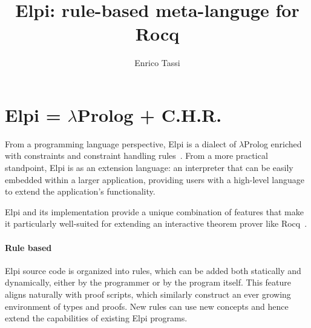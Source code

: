 \documentclass[sigplan,natbib=false]{acmart}
\author{Enrico Tassi}
\affiliation{%
    \institution{Université Côte d'Azur, Inria}
    \country{France}
}
\title{Elpi: rule-based meta-languge for Rocq}
\begin{document}
\maketitle

\section{Elpi = $\lambda$Prolog + C.H.R.}

% 

From a programming language perspective, Elpi is a dialect of $\lambda$Prolog
enriched with constraints and constraint handling rules~\cite{dunchev15lpar,TASSI_2019}. From a more practical
standpoint, Elpi is as an extension language: an interpreter that can be easily
embedded within a larger application, providing users with a high-level
language to extend the application's functionality.

Elpi and its implementation provide a unique combination of features that make
it particularly well-suited for extending an interactive theorem prover like
Rocq~\cite{tassi:hal-01637063}.

\paragraph{Rule based}

Elpi source code is organized into rules, which can be added both statically
and dynamically, either by the programmer or by the program itself. This
feature aligns naturally with proof scripts, which similarly construct an ever
growing environment of types and proofs. New rules can use new concepts and
hence extend the capabilities of existing Elpi programs.
\end{document}
